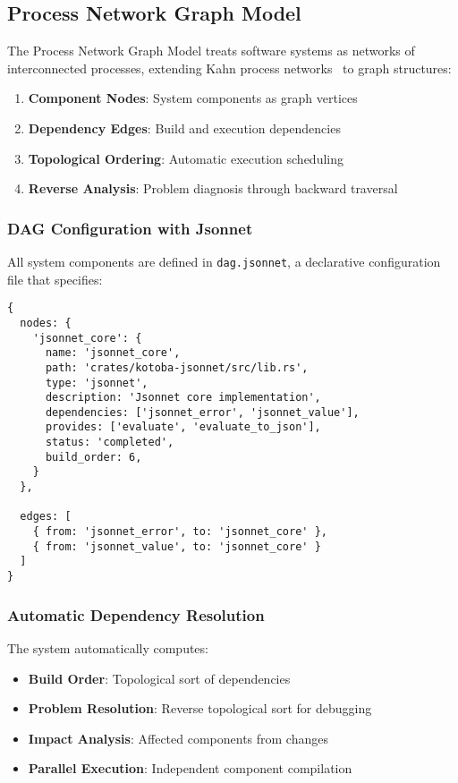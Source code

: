 \documentclass[11pt,a4paper]{article}
\begin{document}
\subsection{Process Network Graph Model}
\label{subsec:process_model}

The Process Network Graph Model treats software systems as networks of interconnected processes, extending Kahn process networks~\cite{kahn1974} to graph structures:

\begin{enumerate}
\item \textbf{Component Nodes}: System components as graph vertices
\item \textbf{Dependency Edges}: Build and execution dependencies
\item \textbf{Topological Ordering}: Automatic execution scheduling
\item \textbf{Reverse Analysis}: Problem diagnosis through backward traversal
\end{enumerate}

\subsubsection{DAG Configuration with Jsonnet}
\label{subsubsec:dag_config}

All system components are defined in \texttt{dag.jsonnet}, a declarative configuration file that specifies:

\begin{lstlisting}[language=jsonnet,caption=Example dag.jsonnet configuration]
{
  nodes: {
    'jsonnet_core': {
      name: 'jsonnet_core',
      path: 'crates/kotoba-jsonnet/src/lib.rs',
      type: 'jsonnet',
      description: 'Jsonnet core implementation',
      dependencies: ['jsonnet_error', 'jsonnet_value'],
      provides: ['evaluate', 'evaluate_to_json'],
      status: 'completed',
      build_order: 6,
    }
  },

  edges: [
    { from: 'jsonnet_error', to: 'jsonnet_core' },
    { from: 'jsonnet_value', to: 'jsonnet_core' }
  ]
}
\end{lstlisting}

\subsubsection{Automatic Dependency Resolution}
\label{subsubsec:dependency_resolution}

The system automatically computes:
\begin{itemize}
\item \textbf{Build Order}: Topological sort of dependencies
\item \textbf{Problem Resolution}: Reverse topological sort for debugging
\item \textbf{Impact Analysis}: Affected components from changes
\item \textbf{Parallel Execution}: Independent component compilation
\end{itemize}
\end{document}
